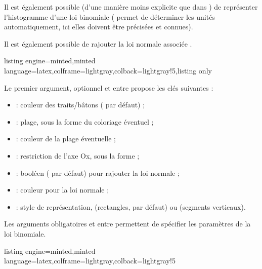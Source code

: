 \documentclass[11pt,a4paper]{ltxdoc}
\begin{document}
Il est également possible (d'une manière moins explicite que dans ) de représenter l'histogramme d'une loi binomiale ( permet de déterminer les unités automatiquement, ici elles doivent être précisées et connues).

Il est également possible de rajouter la loi normale \og associée \fg.

\begin{tcblisting}{listing engine=minted,minted language=latex,colframe=lightgray,colback=lightgray!5,listing only}
\end{tcblisting}

Le premier argument, optionnel et entre \MontreCode{[...]} propose les clés suivantes :

\begin{itemize}
  \item {} : couleur des traits/bâtons ( par défaut) ;
  \item {} : plage, sous la forme  du coloriage éventuel ;
  \item {} : couleur de la plage éventuelle ;
  \item {} : restriction de l'axe Ox, sous la forme  ;
  \item {} : booléen ( par défaut) pour rajouter la loi normale ;
  \item {} : couleur pour la loi normale ;
  \item {} : style de représentation,  (rectangles, par défaut) ou  (segments verticaux).
\end{itemize}

Les arguments obligatoires et entre  permettent de spécifier les paramètres de la loi binomiale.

\begin{tcblisting}{listing engine=minted,minted language=latex,colframe=lightgray,colback=lightgray!5}
\begin{GraphiqueTikz}[x=0.2cm,y=50cm,Origx=-0.5,Xmin=-0.5,Xmax=50.5,
  Xgrille=5,Xgrilles=1,Ymin=0,Ymax=0.12,Ygrille=0.01,Ygrilles=0.001]
\end{GraphiqueTikz}
\end{tcblisting}
\end{document}

